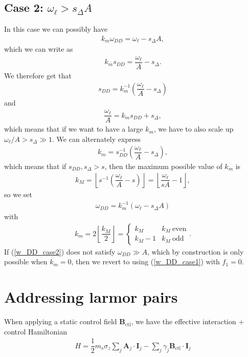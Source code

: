 \documentclass[11pt]{article}
\renewcommand{\t}{\text} %
\newcommand{\f}[2]{\dfrac{#1}{#2}} %
\newcommand{\p}[1]{\left(#1\right)} %
\renewcommand{\v}{\bm} %
\renewcommand{\c}{\cdot} %
\renewcommand{\l}{\ell} %
\newcommand{\floor}[1]{\left\lfloor{#1}\right\rfloor}
\begin{document}
\subsection*{Case 2: $\omega_\l > s_\Delta A$}
In this case we can possibly have
\begin{align}
  k_m\omega_{DD}=\omega_\l-s_\Delta A,
\end{align}
which we can write as
\begin{align}
  k_m s_{DD}=\f{\omega_\l}{A}-s_\Delta.
\end{align}
We therefore get that
\begin{align}
  s_{DD}=k_m^{-1}\p{\f{\omega_\l}{A}-s_\Delta}
\end{align}
and
\begin{align}
  \f{\omega_\l}{A}=k_m s_{DD}+s_\Delta,
\end{align}
which means that if we want to have a large $k_m$, we have to also
scale up $\omega_\l/A>s_\Delta\gg1$. We can alternately express
\begin{align}
  k_m=s_{DD}^{-1}\p{\f{\omega_\l}{A}-s_\Delta},
\end{align}
which means that if $s_{DD},s_\Delta>s$, then the maximum possible
value of $k_m$ is
\begin{align}
  k_M=\floor{s^{-1}\p{\f{\omega_\l}{A}-s}}
  =\floor{\f{\omega_\l}{sA}-1},
  \label{k_M}
\end{align}
so we set
\begin{align}
  \omega_{DD}=k_m^{-1}\p{\omega_\l-s_\Delta A}
  \label{w_DD_case2}
\end{align}
with
\begin{align}
  k_m=2\floor{\f{k_M}2}=\left\{
    \begin{array}{ll}
      k_M & k_M~\t{even} \\
      k_M-1 & k_M~\t{odd}
    \end{array}\right..
\end{align}
If (\ref{w_DD_case2}) does not satisfy $\omega_{DD}\gg A$, which by
construction is only possible when $k_m=0$, then we revert to using
(\ref{w_DD_case1}) with $f_1=0$.

\newpage

\section*{Addressing larmor pairs}

When applying a static control field $\v B_{\t{ctl}}$, we have the
effective interaction + control Hamiltonian
\begin{align}
  H=\f12m_s\sigma_z\sum_j\v A_j\c\v I_j-\sum_j\gamma_j\v
  B_{\t{ctl}}\c\v I_j
\end{align}
\end{document}
